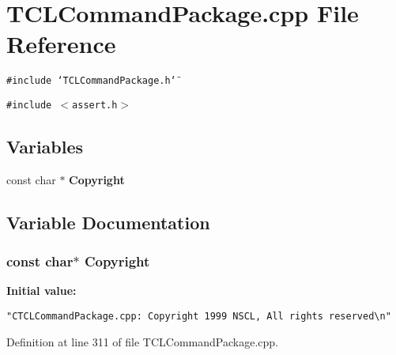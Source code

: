 \section{TCLCommand\-Package.cpp File Reference}
\label{TCLCommandPackage_8cpp}
{\tt \#include \char`\"{}TCLCommand\-Package.h\char`\"{}}\par
{\tt \#include $<$assert.h$>$}\par
\subsection*{Variables}
\begin{CompactItemize}
\item 
const char $\ast$ {\bf Copyright}
\end{CompactItemize}


\subsection{Variable Documentation}
\subsubsection{\setlength{\rightskip}{0pt plus 5cm}const char$\ast$ Copyright\hspace{0.3cm}{\tt  [static]}}\label{TCLCommandPackage_8cpp_a0}


{\bf Initial value:}

\footnotesize\begin{verbatim} 
"CTCLCommandPackage.cpp: Copyright 1999 NSCL, All rights reserved\n"\end{verbatim}\normalsize 


Definition at line 311 of file TCLCommand\-Package.cpp.